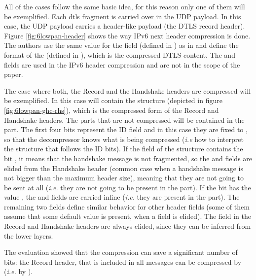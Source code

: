 \documentclass{llncs}
\begin{document}
All of the cases follow the same basic idea, for this reason only one of them will be exemplified. Each \gls{dtls} fragment is carried over in the UDP payload. In this case,
the UDP payload carries a header-like payload (the DTLS record header).
Figure \ref{fig:6lowpan-header} shows the way IPv6 next header compression is done.
The authors use the same value for the  field (defined in \cite{RFC6282})
as in  and define the format of the 
(defined in \cite{RFC6282}), which is the compressed DTLS content. The 
and  fields are used in the IPv6 header compression
and are not in the scope of the paper.

The case where both, the Record and the Handshake headers are compressed
will be exemplified.
In this case  will contain the 
structure (depicted in figure \ref{fig:6lowpan-ghc-rhs}), which is the compressed form of the Record and Handshake headers. The
parts that are not compressed will be contained in the  part.
The first four bits represent the ID field and in this case they are fixed to ,
so that the decompressor knows what is being compressed (\textit{i.e} how to interpret
the structure that follows the ID bits). If the  field of the  structure contains the
bit , it means that the handshake message is not fragmented, so
the  and  fields are
elided from the Handshake header (common case when a handshake message is not bigger than
the maximum header size), meaning that they are not going to be sent at
all (\textit{i.e.} they are not going to be present in the  part).
If the  bit has the value , the 
and  fields are carried inline (\textit{i.e.} they are
present in the  part). The remaining two fields define similar
behavior for other header fields (some of them assume that some default value is present, when a field is elided).
The  field in the Record and Handshake headers are always elided,
since they can be inferred from the lower layers.

The evaluation showed that the compression can save a significant number of bits:
the Record header, that is included in all messages can be compressed by 
(\textit{i.e.} by ).
\end{document}
